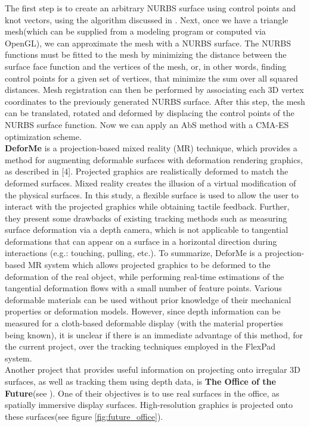 \documentclass[]{article}
\begin{document}
The first step is to create an arbitrary NURBS surface using control points and knot vectors, using the algorithm discussed in \cite{jordt12}. Next, once we have a triangle mesh(which can be supplied from a modeling program or computed via OpenGL), we can approximate the mesh with a NURBS surface. The NURBS functions must be fitted to the mesh by minimizing the distance between the surface face function and the vertices of the mesh, or, in other words, finding control points for a given set of vertices, that minimize the sum over all squared distances. Mesh registration can then be performed by associating each 3D vertex coordinates to the previously generated NURBS surface. After this step, the mesh can be translated, rotated and deformed by displacing the control points of the NURBS surface function. Now we can apply an AbS method with a CMA-ES optimization scheme.\\

\textbf{DeforMe} is a projection-based mixed reality (MR) technique, which provides a method for augmenting deformable surfaces with deformation rendering graphics, as described in [4]. Projected graphics are realistically deformed to match the deformed surfaces. Mixed reality creates the illusion of a virtual modification of the physical surfaces. In this study, a flexible surface is used to allow the user to interact with the projected graphics while obtaining tactile feedback. Further, they present some drawbacks of existing tracking methods such as measuring surface deformation via a depth camera, which is not applicable to tangential deformations that can appear on a surface in a horizontal direction during interactions (e.g.: touching, pulling, etc.). To summarize, DeforMe is a projection-based MR system which allows projected graphics to be deformed to the deformation of the real object, while performing real-time estimations of the tangential deformation flows with a small number of feature points. Various deformable materials can be used without prior knowledge of their mechanical properties or deformation models. However, since depth information can be measured for a cloth-based deformable display (with the material properties being known), it is unclear if there is an immediate advantage of this method, for the current project, over the tracking techniques employed in the FlexPad system.\\

Another project that provides useful information on projecting onto irregular 3D surfaces, as well as tracking them using depth data, is \textbf{The Office of the Future}(see \cite{raskar98}). One of their objectives is to use real surfaces in the office, as spatially immersive display surfaces. High-resolution graphics is projected onto these surfaces(see figure \ref{fig:future_office}).
\end{document}
